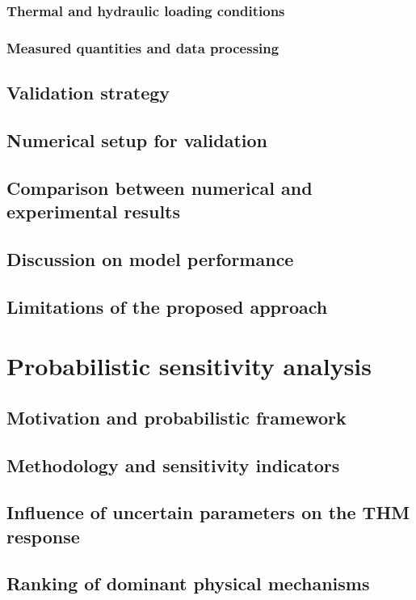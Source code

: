 \documentclass[twoside]{report}
\begin{document}
\subsection{Thermal and hydraulic loading conditions}
\subsection{Measured quantities and data processing}

\section{Validation strategy}
\section{Numerical setup for validation}
\section{Comparison between numerical and experimental results}
\section{Discussion on model performance}
\section{Limitations of the proposed approach}




\cleardoublepage
\chapter{Probabilistic sensitivity analysis}

\section{Motivation and probabilistic framework}
\section{Methodology and sensitivity indicators}
\section{Influence of uncertain parameters on the THM response}
\section{Ranking of dominant physical mechanisms}
\end{document}
